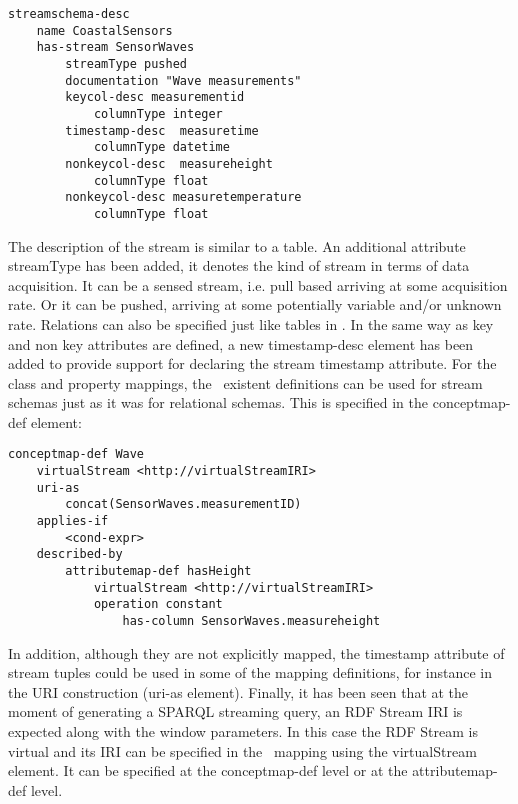 \begin{lstlisting}[style=R2OStyle,language=R2O,frame=none]
streamschema-desc
    name CoastalSensors
    has-stream SensorWaves
        streamType pushed
        documentation "Wave measurements"
        keycol-desc measurementid
            columnType integer
        timestamp-desc  measuretime
            columnType datetime
        nonkeycol-desc  measureheight
            columnType float
        nonkeycol-desc measuretemperature
            columnType float
\end{lstlisting}
The description of the stream is similar to a table. An additional attribute \textsf{streamType} has been added, it denotes the kind of stream in terms of data acquisition. It can be a sensed stream, i.e. pull based arriving at some acquisition rate. Or it can be pushed, arriving at some potentially variable and/or unknown rate. Relations can also be specified just like tables in \stwoo. In the same way as key and non key attributes are defined, a new \textsf{timestamp-desc} element has been added to provide support for declaring the stream timestamp attribute.
For the class and property mappings, the \rtwoo\ existent definitions can be used for stream schemas just as it was for relational schemas. This is specified in the \textsf{conceptmap-def} element:
\begin{lstlisting}[style=R2OStyle,language=R2O,frame=none]
conceptmap-def Wave
    virtualStream <http://virtualStreamIRI>
    uri-as
        concat(SensorWaves.measurementID)
    applies-if
        <cond-expr>
    described-by
        attributemap-def hasHeight
            virtualStream <http://virtualStreamIRI>
            operation constant
                has-column SensorWaves.measureheight
\end{lstlisting}
In addition, although they are not explicitly mapped, the timestamp attribute of stream tuples could be used in some of the mapping definitions, for instance in the URI construction (\textsf{uri-as} element).
Finally, it has been seen that at the moment of generating a SPARQL streaming query, an RDF Stream IRI is expected along with the window parameters. In this case the RDF Stream is virtual and its IRI can be specified in the \stwoo\ mapping using the \textsf{virtualStream} element. It can be specified at the \textsf{conceptmap-def} level or at the \textsf{attributemap-def} level.

